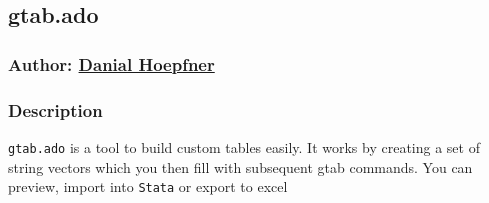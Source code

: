 {\begin{lstlisting}[language=Stata, numbers=none]
\end{lstlisting}

\subsection{gtab.ado}
\subsubsection{Author: \href{mailto:dhoepfner@gibsonconsult.com}{Danial Hoepfner}}
\subsubsection{Description}
\texttt{gtab.ado} is a tool to build custom tables easily. It works by creating a set of string vectors which you then fill with subsequent gtab commands. You can preview, import into \texttt{Stata} or export to excel
}
